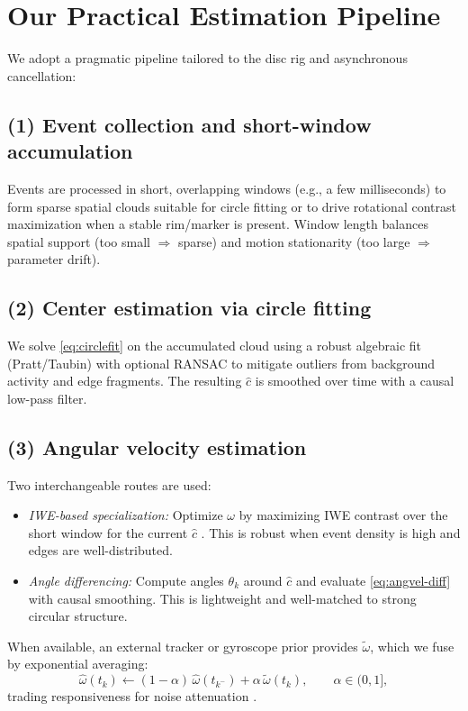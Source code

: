 \section{Our Practical Estimation Pipeline}
\label{sec:our-pipeline}
We adopt a pragmatic pipeline tailored to the disc rig and asynchronous cancellation:

\subsection*{(1) Event collection and short-window accumulation}
Events are processed in short, overlapping windows (e.g., a few milliseconds) to form sparse spatial clouds suitable for circle fitting or to drive rotational contrast maximization when a stable rim/marker is present. Window length balances spatial support (too small $\Rightarrow$ sparse) and motion stationarity (too large $\Rightarrow$ parameter drift).

\subsection*{(2) Center estimation via circle fitting}
We solve \eqref{eq:circlefit} on the accumulated cloud using a robust algebraic fit (Pratt/Taubin) with optional RANSAC to mitigate outliers from background activity and edge fragments. The resulting $\hat c$ is smoothed over time with a causal low-pass filter.

\subsection*{(3) Angular velocity estimation}
Two interchangeable routes are used:
\begin{itemize}
\item \emph{IWE-based specialization:} Optimize $\omega$ by maximizing IWE contrast over the short window for the current $\hat c$ \cite{Gallego2017Angular,Gallego2018CMax}. This is robust when event density is high and edges are well-distributed.
\item \emph{Angle differencing:} Compute angles $\theta_k$ around $\hat c$ and evaluate \eqref{eq:angvel-diff} with causal smoothing. This is lightweight and well-matched to strong circular structure.
\end{itemize}
When available, an external tracker or gyroscope prior provides $\tilde\omega$, which we fuse by exponential averaging:
\begin{equation}
\hat\omega(t_k) \leftarrow (1-\alpha)\,\hat\omega(t_{k^-}) + \alpha\,\tilde\omega(t_k),\qquad \alpha\in(0,1],
\label{eq:ema}
\end{equation}
trading responsiveness for noise attenuation \cite{Rebecq2017EVO}.

